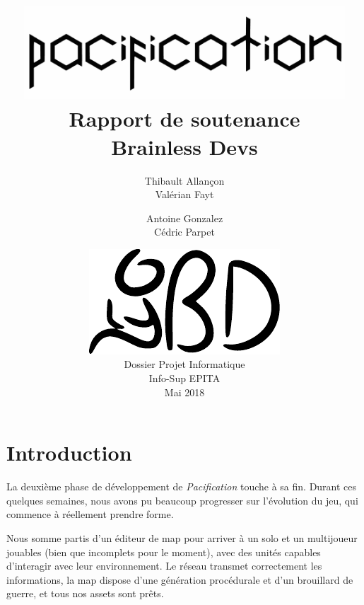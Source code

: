 \documentclass[12pt]{report}
\begin{document}
\title{
	{\vspace{3em}\protect\centering\protect\includegraphics[width=0.9\textwidth]{pacification_vector.pdf}}\\
	{\vspace{4em}\Huge Rapport de soutenance}\\
	{\large Brainless Devs}
}
\author{
	Thibault Allançon\\
	Valérian Fayt
	\and
	Antoine Gonzalez\\
	Cédric Parpet}
\date{
	{\vfill\protect\centering\protect\includegraphics{brainless_devs.pdf}}\\
	Dossier Projet Informatique\\
	Info-Sup EPITA\\
	Mai 2018
}

\maketitle
\tableofcontents

\chapter{Introduction}

La deuxième phase de développement de \textit{Pacification} touche à sa fin. Durant ces quelques semaines, nous avons pu beaucoup progresser sur l’évolution du jeu, qui commence à réellement prendre forme. 

Nous somme partis d’un éditeur de map pour arriver à un solo et un multijoueur jouables (bien que incomplets pour le moment), avec des unités capables d'interagir avec leur environnement. Le réseau transmet correctement les informations, la map dispose d’une génération procédurale et d’un brouillard de guerre, et tous nos assets sont prêts.
\end{document}

